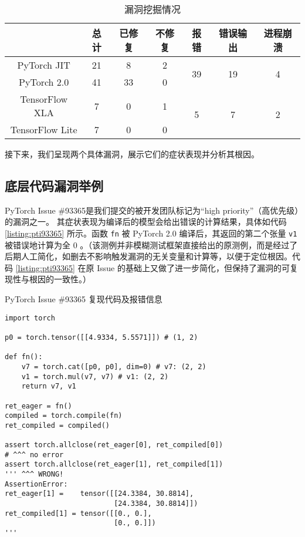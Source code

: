 \begin{table}[]
\centering
\caption{漏洞挖掘情况}
\label{tab:bugs}
\begin{tabular}{ccccccc}
  \toprule
                  & 总计 & 已修复 & 不修复 & 报错                  & 错误输出                & 进程崩溃               \\ \midrule
  PyTorch JIT     & 21 & 8   & 2   & \multirow{2}{*}{39} & \multirow{2}{*}{19} & \multirow{2}{*}{4} \\
  PyTorch 2.0     & 41 & 33  & 0   &                     &                     &                    \\ \cmidrule(lr){1-7} 
  TensorFlow XLA  & 7  & 0   & 1   & \multirow{2}{*}{5}  & \multirow{2}{*}{7}  & \multirow{2}{*}{2} \\
  TensorFlow Lite & 7  & 0   & 0   &                     &                     &                    \\ \bottomrule
\end{tabular}
\end{table}

接下来，我们呈现两个具体漏洞，展示它们的症状表现并分析其根因。

\subsection{底层代码漏洞举例}

PyTorch Issue \#93365\cite{pti93365}是我们提交的被开发团队标记为“high priority”（高优先级）的漏洞之一。
其症状表现为编译后的模型会给出错误的计算结果，具体如代码 \ref{listing:pti93365} 所示。函数 \texttt{fn} 被 PyTorch 2.0 编译后，其返回的第二个张量 \texttt{v1} 被错误地计算为全 0 。（该测例并非模糊测试框架直接给出的原测例，而是经过了后期人工简化，如删去不影响触发漏洞的无关变量和计算等，以便于定位根因。代码 \ref{listing:pti93365} 在原 Issue 的基础上又做了进一步简化，但保持了漏洞的可复现性与根因的一致性。）

\begin{listing}[]
    \caption{PyTorch Issue \#93365 复现代码及报错信息}
    \label{listing:pti93365}
\begin{verbatim}
import torch

p0 = torch.tensor([[4.9334, 5.5571]]) # (1, 2)

def fn():
    v7 = torch.cat([p0, p0], dim=0) # v7: (2, 2)
    v1 = torch.mul(v7, v7) # v1: (2, 2)
    return v7, v1

ret_eager = fn()
compiled = torch.compile(fn)
ret_compiled = compiled()

assert torch.allclose(ret_eager[0], ret_compiled[0])
# ^^^ no error
assert torch.allclose(ret_eager[1], ret_compiled[1])
''' ^^^ WRONG!
AssertionError: 
ret_eager[1] =    tensor([[24.3384, 30.8814],
                          [24.3384, 30.8814]])
ret_compiled[1] = tensor([[0., 0.],
                          [0., 0.]])
'''
\end{verbatim}
\end{listing}

